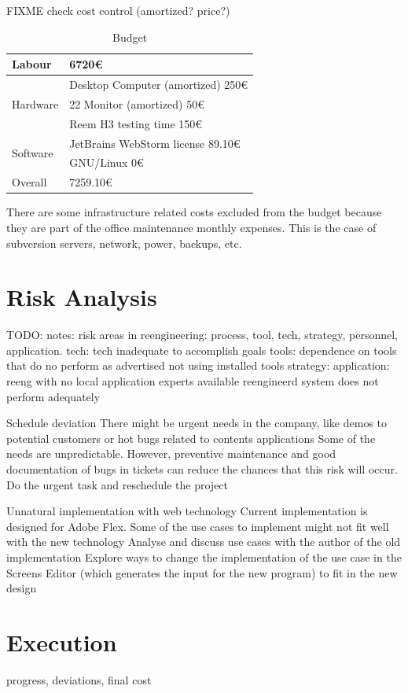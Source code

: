 FIXME check cost control (amortized? price?)

\begin{table}[ht]
    \centering
    \caption{Budget}
    \label{tab:budget}
    \begin{tabular}{| l | l |}
    \hline
    Labour & 6720\euro{} \\ \hline
    \multirow{3}{*}{Hardware} 
        & Desktop Computer (amortized) 250\euro{} \\ %
        & 22 Monitor (amortized) 50\euro{} \\
        & Reem H3 testing time 150\euro{} \\ \hline   
    \multirow{2}{*}{Software}
        & JetBrains WebStorm license 89.10\euro{} \\ %
        & GNU/Linux 0\euro{} \\ \hline
     Overall & 7259.10\euro{} \\ 
     \hline
    \end{tabular}
\end{table}

There are some infrastructure related costs excluded from the budget because they are part of the office maintenance monthly expenses.
This is the case of subversion servers, network, power, backups, etc. 

\section{Risk Analysis}
TODO: notes: risk areas in reengineering: process, tool,  tech, strategy, personnel, application.
tech:  tech inadequate to accomplish goals
tools: dependence on tools that do no perform as advertised
not using installed tools
strategy: 
application: reeng with no local application experts available 
reengineerd system does not perform adequately

\label{sec:risk}
\begin{risk}
{Schedule deviation}
{There might be urgent needs in the company, like demos to potential customers or hot bugs related to contents applications}
{Some of the needs are unpredictable. However, preventive maintenance and good documentation of bugs in tickets can reduce the chances that this risk will occur.}
{Do the urgent task and reschedule the project}
\end{risk}

\begin{risk}
{Unnatural implementation with web technology}
{Current implementation is designed for Adobe Flex. Some of the use cases to implement might not fit well with the new technology}
{Analyse and discuss use cases with the author of the old implementation}
{Explore ways to change the implementation of the use case in the Screens Editor (which generates the input for the new program) to fit in the new design}
\end{risk}


\section{Execution}
progress, deviations, final cost
